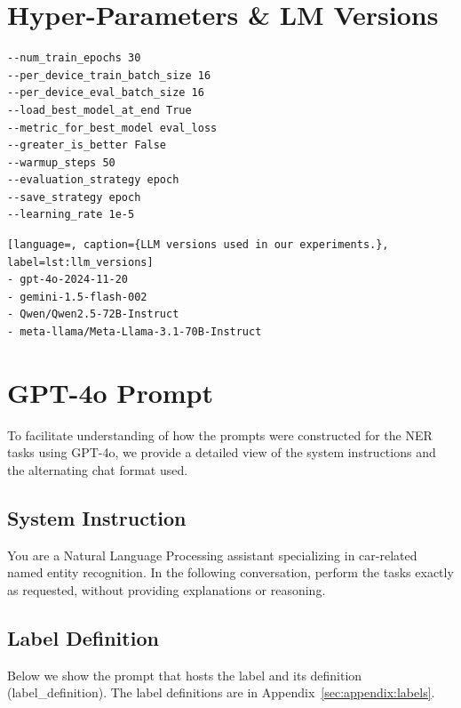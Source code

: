 \documentclass[11pt]{article}
\begin{document}
\section{Hyper-Parameters \& LM Versions}
\label{sec:hyper-params}

\begin{lstlisting}[language=bash, caption={Encoder transformer hyper-parameter settings used in experiments.}, label=lst:hyperparameters]
--num_train_epochs 30
--per_device_train_batch_size 16
--per_device_eval_batch_size 16
--load_best_model_at_end True
--metric_for_best_model eval_loss
--greater_is_better False
--warmup_steps 50
--evaluation_strategy epoch
--save_strategy epoch
--learning_rate 1e-5
\end{lstlisting}

\begin{lstlisting}[language=, caption={LLM versions used in our experiments.}, label=lst:llm_versions]
- gpt-4o-2024-11-20
- gemini-1.5-flash-002
- Qwen/Qwen2.5-72B-Instruct
- meta-llama/Meta-Llama-3.1-70B-Instruct
\end{lstlisting}

\section{GPT-4o Prompt}
\label{sec:appendix:prompt}
To facilitate understanding of how the prompts were constructed for the NER tasks using GPT-4o, we provide a detailed view of the system instructions and the alternating chat format used.

\subsection{System Instruction}
\begin{tcolorbox}[colback=gray!5!white,colframe=gray!75!black,title=System Instruction]
You are a Natural Language Processing assistant specializing in car-related named entity recognition. In the following conversation, perform the tasks exactly as requested, without providing explanations or reasoning.
\end{tcolorbox}

\subsection{Label Definition}
Below we show the prompt that hosts the label and its definition (label\_definition). The label definitions are in Appendix~\ref{sec:appendix:labels}.
\end{document}
